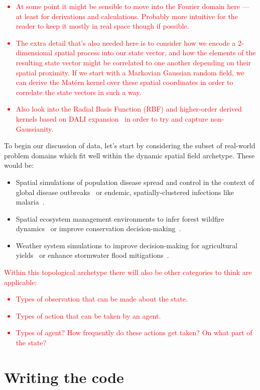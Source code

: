 \textcolor{red}{
\begin{itemize}
\item{At some point it might be sensible to move into the Fourier domain here --- at least for derivations and calculations. Probably more intuitive for the reader to keep it mostly in real space though if possible.} 
\item{The extra detail that's also needed here is to consider how we encode a 2-dimensional spatial process into our state vector, and how the elements of the resulting state vector might be correlated to one another depending on their spatial proximity. If we start with a Markovian Gaussian random field, we can derive the Mat\'{e}rn kernel over these spatial coordinates in order to correlate the state vectors in such a way.} 
\item{Also look into the Radial Basis Function (RBF) and higher-order derived kernels based on DALI expansion~\cite{sellentin2014breaking} in order to try and capture non-Gaussianity.}
\end{itemize}
}

To begin our discussion of data, let's start by considering the subset of real-world problem domains which fit well within the dynamic spatial field archetype. These would be:
\begin{itemize}
\item{Spatial simulations of population disease spread and control in the context of global disease outbreaks~\cite{ohi2020exploring} or endemic, spatially-clustered infections like malaria~\cite{carter2000spatial}.}
\item{Spatial ecosystem management environments to infer forest wildfire dynamics~\cite{ganapathi2018using} or improve conservation decision-making~\cite{lapeyrolerie2022deep}.}
\item{Weather system simulations to improve decision-making for agricultural yields~\cite{chen2021reinforcement} or enhance stormwater flood mitigations~\cite{saliba2020deep}.}
\end{itemize}

\textcolor{red}{Within this topological archetype there will also be other categories to think are applicable:
\begin{itemize}
\item{Types of observation that can be made about the state.}
\item{Types of action that can be taken by an agent.}
\item{Types of agent? How frequently do these actions get taken? On what part of the state?}
\end{itemize}
}

\section{\sffamily Writing the code}